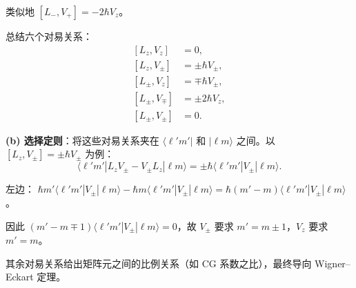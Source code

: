 \begin{solution}
	类似地 $[L_-,V_+] = -2\hbar V_z$。

	总结六个对易关系：
	\[
	\boxed{
	\begin{aligned}
	[L_z,V_z] &= 0, \\
	[L_z,V_\pm] &= \pm\hbar V_\pm, \\
	[L_\pm,V_z] &= \mp\hbar V_\pm, \\
	[L_\pm,V_\mp] &= \pm 2\hbar V_z, \\
	[L_\pm,V_\pm] &= 0.
	\end{aligned}}
	\]

	\textbf{(b) 选择定则}：将这些对易关系夹在 $\langle\ell'm'|$ 和 $|\ell m\rangle$ 之间。以 $[L_z,V_\pm]=\pm\hbar V_\pm$ 为例：
	\[
	\langle\ell'm'|L_zV_\pm - V_\pm L_z|\ell m\rangle = \pm\hbar\langle\ell'm'|V_\pm|\ell m\rangle.
	\]

	左边：
	$\hbar m'\langle\ell'm'|V_\pm|\ell m\rangle - \hbar m\langle\ell'm'|V_\pm|\ell m\rangle = \hbar(m'-m)\langle\ell'm'|V_\pm|\ell m\rangle$。

	因此 $(m'-m\mp1)\langle\ell'm'|V_\pm|\ell m\rangle=0$，故 $V_\pm$ 要求 $m'=m\pm1$，$V_z$ 要求 $m'=m$。

	其余对易关系给出矩阵元之间的比例关系（如 CG 系数之比），最终导向 Wigner--Eckart 定理。
	\end{solution}

